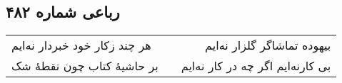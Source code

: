 \begin{center}
\section*{رباعی شماره ۴۸۲}
\label{sec:sh482}
\begin{longtable}{l p{0.5cm} r}
هر چند زکار خود خبردار نه‌ایم
&&
بیهوده تماشاگر گلزار نه‌ایم
\\
بر حاشیهٔ کتاب چون نقطهٔ شک
&&
بی کارنه‌ایم اگر چه در کار نه‌ایم
\\
\end{longtable}
\end{center}
